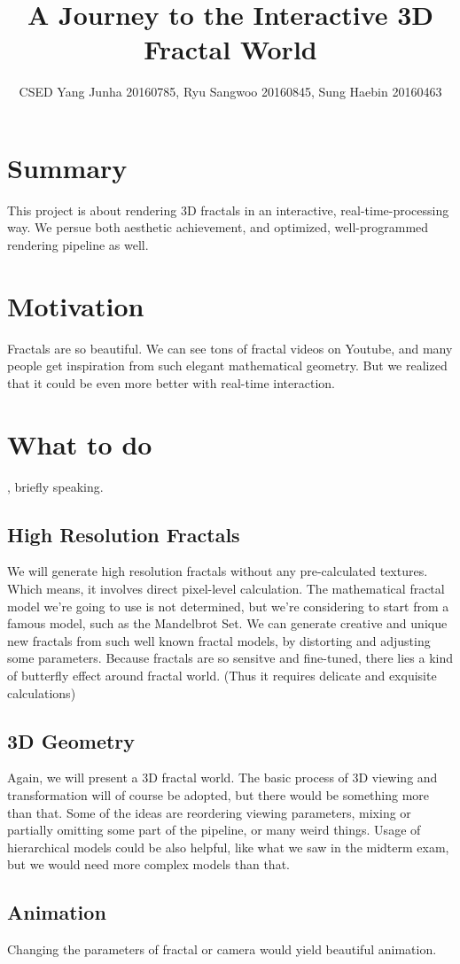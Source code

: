 \documentclass[a4paper]{article}
\title{A Journey to the Interactive 3D Fractal World}
\author{CSED Yang Junha 20160785, Ryu Sangwoo 20160845, Sung Haebin 20160463}
\begin{document}
\maketitle
\section{Summary}
This project is about rendering 3D fractals in an interactive, real-time-processing way.
We persue both aesthetic achievement, and optimized, well-programmed rendering pipeline as well.
\section{Motivation}
Fractals are so beautiful.
We can see tons of fractal videos on Youtube, and many people get inspiration from such elegant mathematical geometry.
But we realized that it could be even more better with real-time interaction.
\section{What to do}
, briefly speaking.
\subsection{High Resolution Fractals}
We will generate high resolution fractals without any pre-calculated textures.
Which means, it involves direct pixel-level calculation.
The mathematical fractal model we're going to use is not determined, but we're considering to start from a famous model, such as the Mandelbrot Set.
We can generate creative and unique new fractals from such well known fractal models, by distorting and adjusting some parameters.
Because fractals are so sensitve and fine-tuned, there lies a kind of butterfly effect around fractal world.
(Thus it requires delicate and exquisite calculations)
\subsection{3D Geometry}
Again, we will present a 3D fractal world.
The basic process of 3D viewing and transformation will of course be adopted, but there would be something more than that.
Some of the ideas are reordering viewing parameters, mixing or partially omitting some part of the pipeline, or many weird things.
Usage of hierarchical models could be also helpful, like what we saw in the midterm exam, but we would need more complex models than that.
\subsection{Animation}
Changing the parameters of fractal or camera would yield beautiful animation.
\end{document}
